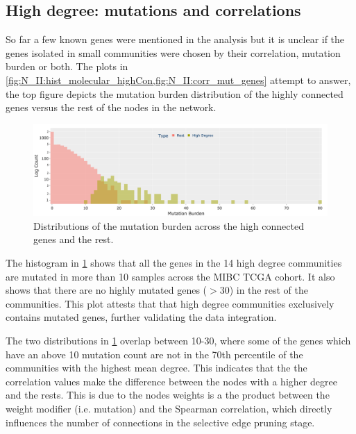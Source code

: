 \subsection{High degree: mutations and correlations} \label{s:N_II:corr_mut_burden}

So far a few known genes were mentioned in the analysis but it is unclear if the genes isolated in small communities were chosen by their correlation, mutation burden or both. The plots in \cref{fig:N_II:hist_molecular_highCon,fig:N_II:corr_mut_genes} attempt to answer, the top figure depicts the mutation burden distribution of the highly connected genes versus the rest of the nodes in the network. 

\begin{figure}[!htb]    
    \centering
        \includegraphics[width=1.0\textwidth,height=1.0\textheight,keepaspectratio]{Sections/Network_II/resources/reward/smallCom_MutHist.png}
        \caption{Distributions of the mutation burden across the high connected genes and the rest.}
        \label{fig:N_II:hist_molecular_highCon}
\end{figure}


The histogram in \cref{fig:N_II:hist_molecular_highCon} shows that all the genes in the 14 high degree communities are mutated in more than 10 samples across the MIBC TCGA cohort. It also shows that there are no highly mutated genes ($>$30) in the rest of the communities. This plot attests that that high degree communities exclusively contains mutated genes, further validating the data integration.

The two distributions in \cref{fig:N_II:hist_molecular_highCon} overlap between 10-30, where some of the genes which have an above 10 mutation count are not in the 70th percentile of the communities with the highest mean degree. This indicates that the the correlation values make the difference between the nodes with a higher degree and the rests. This is due to the nodes weights is a the product between the weight modifier (i.e. mutation) and the Spearman correlation, which directly influences the number of connections in the selective edge pruning stage.

